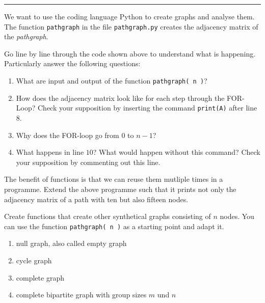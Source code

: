 



  \sheet[%
  number=1,
      topic={Introduction into Network Theory},
    ]

\vspace{-1cm}
\noindent\rule{12cm}{0.4pt}

  \exercise[%
  topic = Create Graphs with Python.
    ]

We want to use the coding language Python to create graphs and analyse them. The function {\tt pathgraph} in the file {\tt pathgraph.py} creates the adjacency matrix of the \emph{pathgraph}.

  




 \subexercise[%
  topic=Understanding the Programme and Adapting it,
    ]

Go line by line through the code shown above to understand what is happening. Particularly answer the following questions:

\begin{enumerate}
\item What are input and output of the function {\tt pathgraph( n )}?
\item How does the adjacency matrix look like for each step through the FOR-Loop? Check your supposition by inserting the command {\tt print(A)} after line $8$.
\item Why does the FOR-loop go from $0$ to $n-1$?
\item What happens in line $10$? What would happen without this command? Check your supposition by commenting out this line.
\end{enumerate}

The benefit of functions is that we can reuse them mutliple times in a programme. Extend the above programme such that it prints not only the adjacency matrix of a path with ten but also fifteen nodes.

 \subexercise[%
  topic=Creating Graphs,
    ] \label{subex:creating}

Create functions that create other synthetical graphs consisting of $n$ nodes. You can use the function {\tt pathgraph( n )} as a starting point and adapt it.

\begin{enumerate}
\item null graph, also called empty graph
\item cycle graph
\item complete graph
\item complete bipartite graph with group sizes $m$ und $n$
\end{enumerate}


